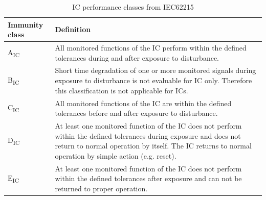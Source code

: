 \begin{table}[!h]
\centering
\begin{tabular}{l|p{}}
Immunity class  & Definition   \\ \midrule
A\textsubscript{IC}   & All monitored functions of the IC perform within the defined tolerances during and after exposure to disturbance.      \\ \midrule
B\textsubscript{IC}   & Short time degradation of one or more monitored signals during exposure to disturbance is not evaluable for IC only. Therefore this classification is not applicable for ICs. \\ \midrule
C\textsubscript{IC}   & All monitored functions of the IC are within the defined tolerances before and after exposure to disturbance.        \\ \midrule
D\textsubscript{IC}   &  At least one monitored function of the IC does not perform within the defined tolerances during exposure and does not return to normal operation by itself. The IC returns to normal operation by simple action (e.g. reset).   \\ \midrule
E\textsubscript{IC}   &  At least one monitored function of the IC does not perform within the defined tolerances after exposure and can not be returned to proper operation.  \\
\bottomrule
\end{tabular}
\caption{IC performance classes from IEC62215}
\label{tab:class-a-levels}
\end{table}
